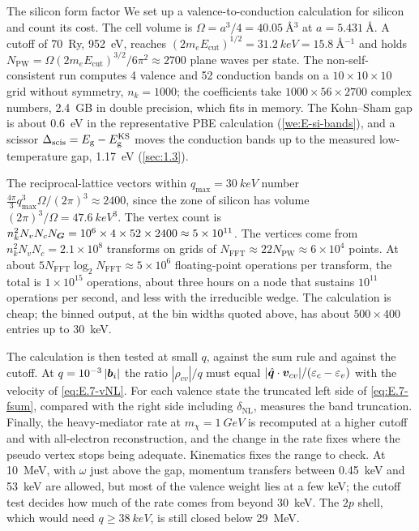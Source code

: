 \begin{workedexample}{The silicon form factor}\label{we:E-siff}
We set up a valence-to-conduction calculation for silicon and count its cost. The cell volume is $\Omega = a^3/4 = \SI{40.05}{\angstrom^3}$ at $a = \SI{5.431}{\angstrom}$. A cutoff of \SI{70}{Ry}, \SI{952}{eV}, reaches $(2m_eE_{\mathrm{cut}})^{1/2} = \SI{31.2}{keV} = \SI{15.8}{\angstrom^{-1}}$ and holds $N_{\mathrm{PW}} = \Omega(2m_eE_{\mathrm{cut}})^{3/2}/6\pi^2 \approx 2700$ plane waves per state. The non-self-consistent run computes 4 valence and 52 conduction bands on a $10\times10\times10$ grid without symmetry, $n_k = 1000$; the coefficients take $1000\times56\times2700$ complex numbers, \SI{2.4}{GB} in double precision, which fits in memory. The Kohn--Sham gap is about \SI{0.6}{eV} in the representative PBE calculation (\cref{we:E-si-bands}), and a scissor $\Delta_{\mathrm{scis}} = E_{\mathrm{g}} - E_{\mathrm{g}}^{\mathrm{KS}}$ moves the conduction bands up to the measured low-temperature gap, \SI{1.17}{eV} (\cref{sec:1.3}).

The reciprocal-lattice vectors within $q_{\mathrm{max}} = \SI{30}{keV}$ number $\frac{4\pi}{3}q_{\mathrm{max}}^3\Omega/(2\pi)^3 \approx 2400$, since the zone of silicon has volume $(2\pi)^3/\Omega = \SI{47.6}{keV^3}$. The vertex count is $n_k^2N_vN_cN_{\bm{G}} = 10^6\times4\times52\times2400 \approx 5\times10^{11}$. The vertices come from $n_k^2N_vN_c = 2.1\times10^8$ transforms on grids of $N_{\mathrm{FFT}} \approx 22N_{\mathrm{PW}} \approx 6\times10^4$ points. At about $5N_{\mathrm{FFT}}\log_2N_{\mathrm{FFT}} \approx 5\times10^6$ floating-point operations per transform, the total is $1\times10^{15}$ operations, about three hours on a node that sustains $10^{11}$ operations per second, and less with the irreducible wedge. The calculation is cheap; the binned output, at the bin widths quoted above, has about $500\times400$ entries up to \SI{30}{keV}.

The calculation is then tested at small $q$, against the sum rule and against the cutoff. At $q = 10^{-3}\,|\bm{b}_i|$ the ratio $|\rho_{cv}|/q$ must equal $|\hat{\bm{q}}\cdot\bm{v}_{cv}|/(\varepsilon_c - \varepsilon_v)$ with the velocity of \cref{eq:E.7-vNL}. For each valence state the truncated left side of \cref{eq:E.7-fsum}, compared with the right side including $\delta_{\mathrm{NL}}$, measures the band truncation. Finally, the heavy-mediator rate at $m_\chi = \SI{1}{GeV}$ is recomputed at a higher cutoff and with all-electron reconstruction, and the change in the rate fixes where the pseudo vertex stops being adequate. Kinematics fixes the range to check. At \SI{10}{MeV}, with $\omega$ just above the gap, momentum transfers between \SI{0.45}{keV} and \SI{53}{keV} are allowed, but most of the valence weight lies at a few keV; the cutoff test decides how much of the rate comes from beyond \SI{30}{keV}. The $2p$ shell, which would need $q \ge \SI{38}{keV}$, is still closed below \SI{29}{MeV}.
\end{workedexample}
